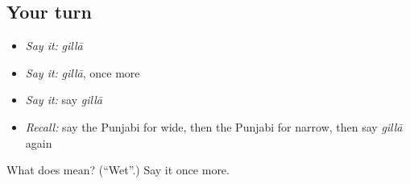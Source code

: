 \subsection*{Your turn}
\begin{itemize}
\raggedright
  \item \emph{Say it:} \emph{gillā}
  \item \emph{Say it:} \emph{gillā}, once more
  \item \emph{Say it:} say \emph{gillā}
  \item \emph{Recall:} say the Punjabi for wide, then the Punjabi for narrow, then say \emph{gillā} again
\end{itemize}

\begin{tcolorbox}[breakable,colback=teal!4,colframe=teal!35!black,title={Before you move on}]
What does  mean? (\textquotedblleft{}Wet\textquotedblright{}.) Say it once more.
\end{tcolorbox}
